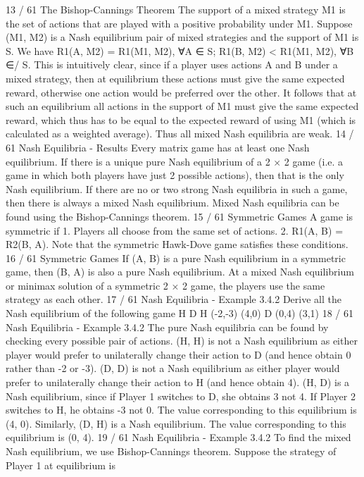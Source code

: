 \documentclass[]{report}
\begin{document}
13 / 61
The Bishop-Cannings Theorem
The support of a mixed strategy M1 is the set of actions that are
played with a positive probability under M1.
Suppose (M1, M2) is a Nash equilibrium pair of mixed strategies
and the support of M1 is S. We have
R1(A, M2) = R1(M1, M2), ∀A ∈ S; R1(B, M2) < R1(M1, M2), ∀B ∈/ S.
This is intuitively clear, since if a player uses actions A and B
under a mixed strategy, then at equilibrium these actions must give
the same expected reward, otherwise one action would be preferred
over the other.
It follows that at such an equilibrium all actions in the support of
M1 must give the same expected reward, which thus has to be
equal to the expected reward of using M1 (which is calculated as a
weighted average). Thus all mixed Nash equilibria are weak.
14 / 61
Nash Equilibria - Results
Every matrix game has at least one Nash equilibrium.
If there is a unique pure Nash equilibrium of a 2 × 2 game (i.e. a
game in which both players have just 2 possible actions), then that
is the only Nash equilibrium.
If there are no or two strong Nash equilibria in such a game, then
there is always a mixed Nash equilibrium.
Mixed Nash equilibria can be found using the Bishop-Cannings
theorem.
15 / 61
Symmetric Games
A game is symmetric if
1. Players all choose from the same set of actions.
2. R1(A, B) = R2(B, A).
Note that the symmetric Hawk-Dove game satisfies these
conditions.
16 / 61
Symmetric Games
If (A, B) is a pure Nash equilibrium in a symmetric game, then
(B, A) is also a pure Nash equilibrium.
At a mixed Nash equilibrium or minimax solution of a symmetric
2 × 2 game, the players use the same strategy as each other.
17 / 61
Nash Equilibria - Example 3.4.2
Derive all the Nash equilibrium of the following game
H D
H (-2,-3) (4,0)
D (0,4) (3,1)
18 / 61
Nash Equilibria - Example 3.4.2
The pure Nash equilibria can be found by checking every possible
pair of actions.
(H, H) is not a Nash equilibrium as either player would prefer to
unilaterally change their action to D (and hence obtain 0 rather
than -2 or -3).
(D, D) is not a Nash equilibrium as either player would prefer to
unilaterally change their action to H (and hence obtain 4).
(H, D) is a Nash equilibrium, since if Player 1 switches to D, she
obtains 3 not 4. If Player 2 switches to H, he obtains -3 not 0.
The value corresponding to this equilibrium is (4, 0).
Similarly, (D, H) is a Nash equilibrium. The value corresponding to
this equilibrium is (0, 4).
19 / 61
Nash Equilibria - Example 3.4.2
To find the mixed Nash equilibrium, we use Bishop-Cannings
theorem. Suppose the strategy of Player 1 at equilibrium is
\end{document}
